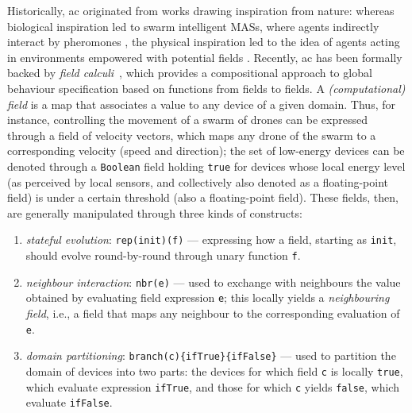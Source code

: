 \documentclass[11pt]{article}
\begin{document}
Historically, \ac{ac} originated from works drawing inspiration from nature: whereas biological inspiration led to swarm intelligent MASs, where agents indirectly interact by pheromones \cite{DBLP:conf/atal/ParunakBS02}, the physical inspiration led to the idea of agents acting in environments empowered with potential fields \cite{DBLP:journals/trob/HwangA92}.
%
Recently, \ac{ac} has been formally backed by \emph{field calculi}~\cite{viroli2019jlamp-si-coord}, which provides a compositional approach to global behaviour specification based on functions from fields to fields.
%
A \emph{(computational) field} is a map that associates a value to any device of a given domain.
%
Thus, for instance, controlling the movement of a swarm of drones can be expressed through a field of velocity vectors, which maps any drone of the swarm to a corresponding velocity (speed and direction); 
%
the set of low-energy devices can be denoted through a \lstinline|Boolean| field holding \texttt{true} for devices whose local energy level (as perceived by local sensors, and collectively also denoted as a floating-point field) is under a certain threshold (also a floating-point field).
%
These fields, then, are generally manipulated through three kinds of constructs:
\begin{enumerate}
\item \emph{stateful evolution}: \lstinline|rep(init)(f)| --- expressing how a field, starting as \lstinline|init|, should evolve round-by-round through unary function \lstinline|f|.
\item \emph{neighbour interaction}: \lstinline|nbr(e)| --- used to exchange with neighbours the value obtained by evaluating field expression \lstinline|e|; this locally yields a \emph{neighbouring field}, i.e., a field that maps any neighbour to the corresponding evaluation of \lstinline|e|.
\item \emph{domain partitioning}: \lstinline|branch(c){ifTrue}{ifFalse}| --- used to partition the domain of devices into two parts: the devices for which field \lstinline|c| is locally \lstinline|true|, which evaluate expression \lstinline|ifTrue|, and those for which \lstinline|c| yields \lstinline|false|, which evaluate \lstinline|ifFalse|. 
\end{enumerate}
\end{document}
